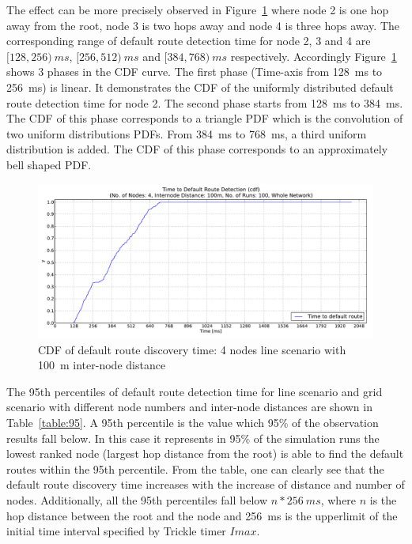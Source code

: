 The effect can be more precisely observed in Figure~\ref{fig:dist100_montecarlo_cdf_hist} where node 2 is one hop away from the root, node 3 is two hops away and node 4 is three hops away. The corresponding range of default route detection time for node 2, 3 and 4 are $[128, 256)\:ms$, $[256, 512)\:ms$ and $[384, 768)\:ms$ respectively. Accordingly Figure~\ref{fig:dist100_montecarlo_cdf_hist} shows 3 phases in the CDF curve. The first phase (Time-axis from 128~ms to 256~ms) is linear. It demonstrates the CDF of the uniformly distributed default route detection time for node 2. The second phase starts from 128~ms to 384~ms. The CDF of this phase corresponds to a triangle PDF which is the convolution of two uniform distributions PDFs. From 384~ms to 768~ms, a third uniform distribution is added. The CDF of this phase corresponds to an approximately bell shaped PDF.


\begin{figure}[htbp]
  \begin{center}
    \leavevmode
      \includegraphics[scale=0.38]
      {Pics/results/4/MRHOF/line/dist100_montecarlo_cdf_hist.pdf}
   \caption{CDF of default route discovery time: 4 nodes line scenario with 100~m inter-node distance}
    \label{fig:dist100_montecarlo_cdf_hist}
  \end{center}
   \vspace{-20pt}
\end{figure}

The 95th percentiles of default route detection time for line scenario and grid scenario with different node numbers and inter-node distances are shown in Table~\ref{table:95}. A 95th percentile is the value which 95\% of the observation results fall below. In this case it represents in 95\% of the simulation runs the lowest ranked node (largest hop distance from the root) is able to find the default routes within the 95th percentile. From the table, one can clearly see that the default route discovery time increases with the increase of distance and number of nodes. Additionally, all the 95th percentiles fall below $n*256\:ms$, where $n$ is the hop distance between the root and the node and 256~ms is the upperlimit of the initial time interval specified by Trickle timer $Imax$.

